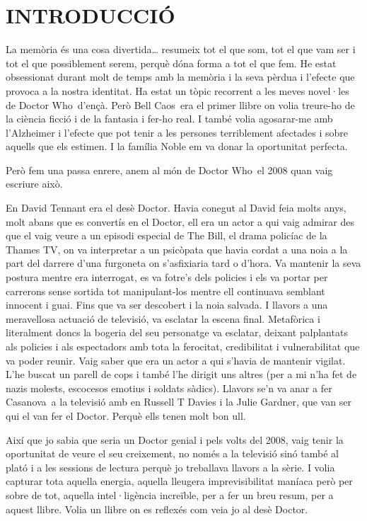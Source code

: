 \chapter*{INTRODUCCIÓ}

La memòria és una cosa divertida\ldots{} resumeix tot el que som, tot el
que vam ser i tot el que possiblement serem, perquè dóna forma a tot el
que fem. He estat obsessionat durant molt de temps amb la memòria i la
seva pèrdua i l'efecte que provoca a la nostra identitat. Ha estat un
tòpic recorrent a les meves novel·les de Doctor Who~d'ençà. Però Bell
Caos~era el primer llibre on volia treure-ho de la ciència ficció i de
la fantasia i fer-ho real. I també volia agosarar-me amb l'Alzheimer i
l'efecte que pot tenir a les persones terriblement afectades i sobre
aquells que els estimen. I la família Noble em va donar la oportunitat
perfecta.

Però fem una passa enrere, anem al món de Doctor Who~el 2008 quan vaig
escriure això.

En David Tennant era el desè Doctor. Havia conegut al David feia molts
anys, molt abans que es convertís en el Doctor, ell era un actor a qui
vaig admirar des que el vaig veure a un episodi especial de The Bill, el
drama policíac de la Thames TV, on va interpretar a un psicòpata que
havia cordat a una noia a la part del darrere d'una furgoneta on
s'asfixiaria tard o d'hora. Va mantenir la seva postura mentre era
interrogat, es va fotre's dels policies i els va portar per carrerons
sense sortida tot manipulant-los mentre ell continuava semblant innocent
i guai. Fins que va ser descobert i la noia salvada. I llavors a una
meravellosa actuació de televisió, va esclatar la escena final.
Metafòrica i literalment doncs la bogeria del seu personatge va
esclatar, deixant palplantats als policies i als espectadors amb tota la
ferocitat, credibilitat i vulnerabilitat que va poder reunir. Vaig saber
que era un actor a qui s'havia de mantenir vigilat. L'he buscat un
parell de cops i també l'he dirigit uns altres (per a mi n'ha fet de
nazis molests, escocesos emotius i soldats sàdics). Llavors se'n va anar
a fer Casanova~a la televisió amb en Russell T Davies i la Julie
Gardner, que van ser qui el van fer el Doctor. Perquè ells tenen molt
bon ull.

Així que jo sabia que seria un Doctor genial i pels volts del 2008, vaig
tenir la oportunitat de veure el seu creixement, no només a la televisió
sinó també al plató i a les sessions de lectura perquè jo treballava
llavors a la sèrie. I volia capturar tota aquella energia, aquella
lleugera imprevisibilitat maníaca però per sobre de tot, aquella
intel·ligència increïble, per a fer un breu resum, per a aquest llibre.
Volia un llibre on es reflexés com veia jo al desè Doctor.

